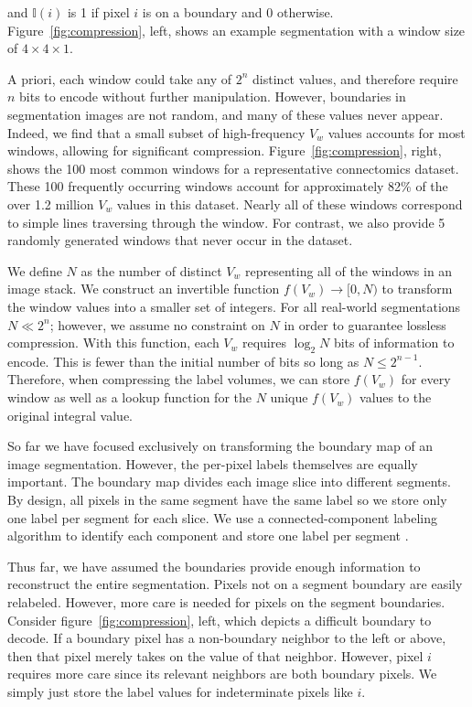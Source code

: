 \noindent
and $\mathbb{I}(i)$ is 1 if pixel $i$ is on a boundary and 0 otherwise. 
Figure~\ref{fig:compression}, left, shows an example segmentation with a window size of $4 \times 4 \times 1$.

A priori, each window could take any of $2^n$ distinct values, and therefore require $n$ bits to encode without further manipulation. 
However, boundaries in segmentation images are not random, and many of these values never appear. 
Indeed, we find that a small subset of high-frequency $V_w$ values accounts for most windows, allowing for significant compression. 
Figure~\ref{fig:compression}, right, shows the 100 most common windows for a representative connectomics dataset. 
These 100 frequently occurring windows account for approximately 82\% of the over 1.2 million $V_w$ values in this dataset.
Nearly all of these windows correspond to simple lines traversing through the window. 
For contrast, we also provide 5 randomly generated windows that never occur in the dataset.

We define $N$ as the number of distinct $V_w$ representing all of the windows in an image stack. 
We construct an invertible function $f(V_w) \to [0, N)$ to transform the window values into a smaller set of integers. 
For all real-world segmentations $N \ll 2^n$; however, we assume no constraint on $N$ in order to guarantee lossless compression. 
With this function, each $V_w$ requires $\log_2{N}$ bits of information to encode. 
This is fewer than the initial number of bits so long as $N \leq 2^{n - 1}$.  
Therefore, when compressing the label volumes, we can store $f(V_w)$ for every window as well as a lookup function for the $N$ unique $f(V_w)$ values to the original integral value.

So far we have focused exclusively on transforming the boundary map of an image segmentation. 
However, the per-pixel labels themselves are equally important. 
The boundary map divides each image slice into different segments. 
By design, all pixels in the same segment have the same label so we store only one label per segment for each slice. 
We use a connected-component labeling algorithm to identify each component and store one label per segment \cite{he2009fast}. 

Thus far, we have assumed the boundaries provide enough information to reconstruct the entire segmentation.
Pixels not on a segment boundary are easily relabeled.
However, more care is needed for pixels on the segment boundaries. 
Consider figure~\ref{fig:compression}, left, which depicts a difficult boundary to decode. 
If a boundary pixel has a non-boundary neighbor to the left or above, then that pixel merely takes on the value of that neighbor. 
However, pixel $i$ requires more care since its relevant neighbors are both boundary pixels. 
We simply just store the label values for indeterminate pixels like $i$.

